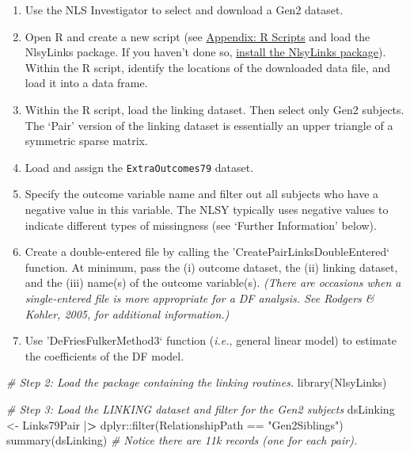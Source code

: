 \documentclass[smallextended]{svjour3}       %
\providecommand{\tightlist}{%
  \setlength{\itemsep}{0pt}\setlength{\parskip}{0pt}}
\newenvironment{Shaded}{\begin{snugshade}}{\end{snugshade}}
\newcommand{\CommentTok}[1]{\textcolor[rgb]{0.56,0.35,0.01}{\textit{#1}}}
\newcommand{\ErrorTok}[1]{\textcolor[rgb]{0.64,0.00,0.00}{\textbf{#1}}}
\newcommand{\FunctionTok}[1]{\textcolor[rgb]{0.00,0.00,0.00}{#1}}
\newcommand{\NormalTok}[1]{#1}
\newcommand{\OtherTok}[1]{\textcolor[rgb]{0.56,0.35,0.01}{#1}}
\newcommand{\SpecialCharTok}[1]{\textcolor[rgb]{0.00,0.00,0.00}{#1}}
\newcommand{\StringTok}[1]{\textcolor[rgb]{0.31,0.60,0.02}{#1}}
\begin{document}
\begin{enumerate}
\def\labelenumi{\arabic{enumi}.}
\tightlist
\item
  Use the NLS Investigator to select and download a Gen2 dataset.
\item
  Open R and create a new script (see
  \protect\hyperlink{appendix-creating-and-saving-r-scripts}{Appendix: R
  Scripts} and load the NlsyLinks package. If you haven't done so,
  \protect\hyperlink{appendix-installing-and-loading-the-nlsylinks-package}{install
  the NlsyLinks package}). Within the R script, identify the locations
  of the downloaded data file, and load it into a data frame.
\item
  Within the R script, load the linking dataset. Then select only Gen2
  subjects. The `Pair' version of the linking dataset is essentially an
  upper triangle of a symmetric sparse matrix.
\item
  Load and assign the \texttt{ExtraOutcomes79} dataset.
\item
  Specify the outcome variable name and filter out all subjects who have
  a negative value in this variable. The NLSY typically uses negative
  values to indicate different types of missingness (see `Further
  Information' below).
\item
  Create a double-entered file by calling the
  'CreatePairLinksDoubleEntered` function. At minimum, pass the (i)
  outcome dataset, the (ii) linking dataset, and the (iii) name(s) of
  the outcome variable(s). \emph{(There are occasions when a
  single-entered file is more appropriate for a DF analysis. See Rodgers
  \& Kohler, 2005, for additional information.)}
\item
  Use 'DeFriesFulkerMethod3` function (\emph{i.e.}, general linear
  model) to estimate the coefficients of the DF model.
\end{enumerate}

\begin{Shaded}
\begin{Highlighting}[]
\CommentTok{\# Step 2: Load the package containing the linking routines.}
\FunctionTok{library}\NormalTok{(NlsyLinks)}

\CommentTok{\# Step 3: Load the LINKING dataset and filter for the Gen2 subjects}
\NormalTok{dsLinking }\OtherTok{\textless{}{-}} 
\NormalTok{  Links79Pair }\SpecialCharTok{|}\ErrorTok{\textgreater{}} 
\NormalTok{  dplyr}\SpecialCharTok{::}\FunctionTok{filter}\NormalTok{(RelationshipPath }\SpecialCharTok{==} \StringTok{"Gen2Siblings"}\NormalTok{)}
\FunctionTok{summary}\NormalTok{(dsLinking) }\CommentTok{\# Notice there are 11k records (one for each pair).}
\end{Highlighting}
\end{Shaded}
\end{document}
